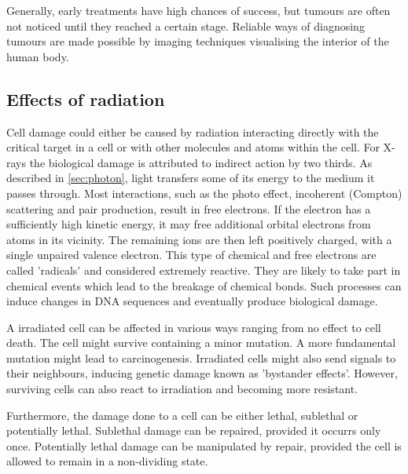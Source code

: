 Generally, early treatments have high chances of success, but tumours are often not noticed until they reached a certain stage. 
Reliable ways of diagnosing tumours are made possible by imaging techniques visualising the interior of the human body. \cite{Baumann2017, Basic Clinical Radiobiology (4th edition)}

\subsection{Effects of radiation}
\label{sec:irradiate}


Cell damage could either be caused by radiation interacting directly with the critical target in a cell or with other molecules and atoms within the cell.
For X-rays the biological damage is attributed to indirect action by two thirds.
As described in \ref{sec:photon}, light transfers some of its energy to the medium it passes through.
Most interactions, such as the photo effect, incoherent (Compton) scattering and pair production, result in free electrons.
If the electron has a sufficiently high kinetic energy, it may free additional orbital electrons from atoms in its vicinity.
The remaining ions are then left positively charged, with a single unpaired valence electron.
This type of chemical and free electrons are called 'radicals' and considered extremely reactive.
They are likely to take part in chemical events which lead to the breakage of chemical bonds.
Such processes can induce changes in DNA sequences and eventually produce biological damage.

A irradiated cell can be affected in various ways ranging from no effect to cell death.
The cell might survive containing a minor mutation.
A more fundamental mutation might lead to carcinogenesis.
Irradiated cells might also send signals to their neighbours, inducing genetic damage known as 'bystander effects'.
However, surviving cells can also react to irradiation and becoming more resistant.

Furthermore, the damage done to a cell can be either lethal, sublethal or potentially lethal.
Sublethal damage can be repaired, provided it occurrs only once.
Potentially lethal damage can be manipulated by repair, provided the cell is allowed to remain in a non-dividing state.

